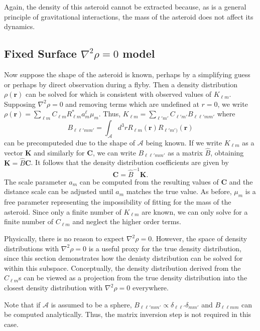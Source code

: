 \documentclass[linenumbers]{aastex631}
\begin{document}
Again, the density of this asteroid cannot be extracted because, as is a general principle of gravitational interactions, the mass of the asteroid does not affect its dynamics.

\subsection{Fixed Surface $\nabla^2 \rho = 0$ model}
Now suppose the shape of the asteroid is known, perhaps by a simplifying guess or perhaps by direct observation during a flyby. Then a density distribution $\rho(\bm r)$ can be solved for which is consistent with observed values of $K_{\ell m}$. Supposing $\nabla^2 \rho = 0$ and removing terms which are undefined at $r=0$, we write $\rho(\bm r) = \sum_{\ell m} C_{\ell m} R_{\ell m}^* a_m^\ell \mu_m$. Thus, $K_{\ell m} = \sum_{\ell' m'} C_{\ell' m'} B_{\ell \ell' m m'}$ where
\begin{equation}
  B_{\ell \ell' m m'} = \int_{\mathcal{A}}d^3 r R_{\ell m}(\bm r) R_{\ell' m')}(\bm r)
  \label{eqn:blm}
\end{equation}
can be precomputeded due to the shape of $\mathcal{A}$ being known.
If we write $K_{\ell m}$ as a vector $\bm K$ and similarly for $\bm C$, we can write $B_{\ell \ell' m m'}$ as a matrix $\hat B$, obtaining $\bm K = \hat B \bm C$. It follows that the density distribution coefficients are given by
\begin{equation}
\bm C = \hat B^{-1} \bm K.
\end{equation}
The scale parameter $a_m$ can be computed from the resulting values of $\bm C$ and the distance scale can be adjusted until $a_m$ matches the true value. As before, $\mu_m$ is a free parameter representing the impossibility of fitting for the mass of the asteroid. Since only a finite number of $K_{\ell m}$ are known, we can only solve for a finite number of $C_{\ell m}$ and neglect the higher order terms.

Physically, there is no reason to expect $\nabla^2 \rho = 0$. However, the space of density distributions with $\nabla^2 \rho = 0$ is a useful proxy for the true density distribution, since this section demonstrates how the denisty distribution can be solved for within this subspace. Conceptually, the density distribution derived from the $C_{\ell m}$s can be viewed as a projection from the true density distribution into the closest density distribution with $\nabla^2 \rho = 0$ everywhere.

Note that if $\mathcal{A}$ is assumed to be a sphere, $B_{\ell \ell' m m'} \propto \delta_{\ell \ell'} \delta_{m m'}$ and $B_{\ell \ell m m}$ can be computed analytically. Thus, the matrix inversion step is not required in this case.
\end{document}
